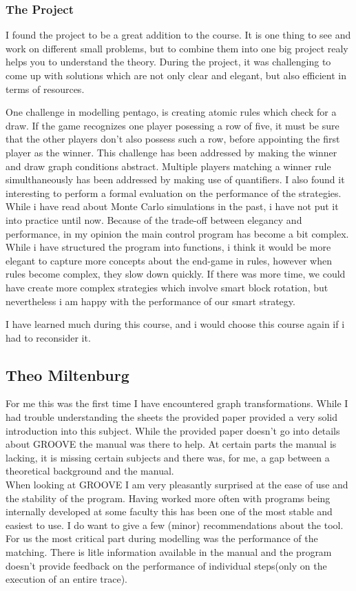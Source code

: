 \subsubsection{The Project}

I found the project to be a great addition to the course.  It is one thing to see and work on different small problems, but to combine them into one big project realy helps you to understand the theory.
During the project, it was challenging to come up with solutions which are not only clear and elegant, but also efficient in terms of resources.

\vspace{6pt}

One challenge in modelling pentago, is creating atomic rules which check for a draw. If the game recognizes one player posessing a row of five, it must be sure that the other players don't also possess such a row, before appointing the first player as the winner.
This challenge has been addressed by making the winner and draw graph conditions abstract.
Multiple players matching a winner rule simulthaneously has been addressed by making use of quantifiers.
I also found it interesting to perform a formal evaluation on the performance of the strategies. While i have read about Monte Carlo simulations in the past, i have not put it into practice until now.
Because of the trade-off between elegancy and performance, in my opinion the main control program has become a bit complex.
While i have structured the program into functions, i think it would be more elegant to capture more concepts about the end-game in rules, however when rules become complex, they slow down quickly.
If there was more time, we could have create more complex strategies which involve smart block rotation, but nevertheless i am happy with the performance of our smart strategy.
\vspace{6pt}

I have learned much during this course, and i would choose this course again if i had to reconsider it.


\subsection{Theo Miltenburg}
For me this was the first time I have encountered graph transformations. While I had trouble understanding the sheets the provided paper provided a very solid introduction into this subject. While the provided paper doesn't go into details about GROOVE the manual was there to help. At certain parts the manual is lacking, it is missing certain subjects and there was, for me, a gap between a theoretical background and the manual.\\
When looking at GROOVE I am very pleasantly surprised at the ease of use and the stability of the program. Having worked more often with programs being internally developed at some faculty this has been one of the most stable and easiest to use. I do want to give a few (minor) recommendations about the tool. For us the most critical part during modelling was the performance of the matching. There is litle information available in the manual and the program doesn't provide feedback on the performance of individual steps(only on the execution of an entire trace).

